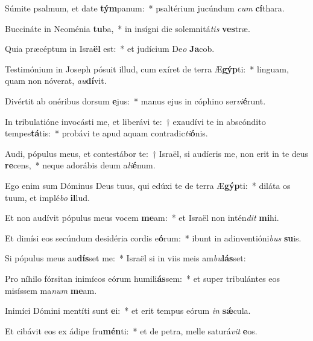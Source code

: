 \item Súmite psalmum, et date \textbf{tým}panum:~* psaltérium jucúndum \textit{cum} \textbf{cí}thara.
\item Buccináte in Neoménia \textbf{tu}ba,~* in insígni die solemnitá\textit{tis} \textbf{ves}træ.
\item Quia præcéptum in Isra\textbf{ël} est:~* et judícium De\textit{o} \textbf{Ja}cob.
\item Testimónium in Joseph pósuit illud, cum exíret de terra Æ\textbf{gýp}ti:~* linguam, quam non nóverat, \textit{au}\textbf{dí}vit.
\item Divértit ab onéribus dorsum \textbf{e}jus:~* manus ejus in cóphino ser\textit{vi}\textbf{é}runt.
\item In tribulatióne invocásti me, et liberávi te:~† exaudívi te in abscóndito tempes\textbf{tá}tis:~* probávi te apud aquam contradic\textit{ti}\textbf{ó}nis.
\item Audi, pópulus meus, et contestábor te:~† Israël, si audíeris me, non erit in te deus \textbf{re}cens,~* neque adorábis deum a\textit{li}\textbf{é}num.
\item Ego enim sum Dóminus Deus tuus, qui edúxi te de terra Æ\textbf{gýp}ti:~* diláta os tuum, et implé\textit{bo} \textbf{il}lud.
\item Et non audívit pópulus meus vocem \textbf{me}am:~* et Israël non intén\textit{dit} \textbf{mi}hi.
\item Et dimísi eos secúndum desidéria cordis e\textbf{ó}rum:~* ibunt in adinventióni\textit{bus} \textbf{su}is.
\item Si pópulus meus au\textbf{dís}set me:~* Israël si in viis meis am\textit{bu}\textbf{lás}set:
\item Pro níhilo fórsitan inimícos eórum humili\textbf{ás}sem:~* et super tribulántes eos misíssem ma\textit{num} \textbf{me}am.
\item Inimíci Dómini mentíti sunt \textbf{e}i:~* et erit tempus eórum \textit{in} \textbf{sǽ}cula.
\item Et cibávit eos ex ádipe fru\textbf{mén}ti:~* et de petra, melle saturá\textit{vit} \textbf{e}os.

